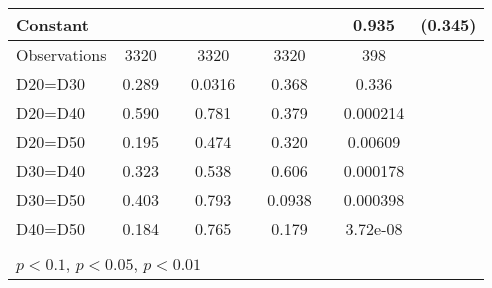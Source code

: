 \begin{tabular}{l|cccccc|cc}
Constant        &                  &         &                  &         &                  &         &    0.935\sym{***}&  (0.345)\\
\hline
Observations    &     3320         &         &     3320         &         &     3320         &         &      398         &         \\
D20=D30         &    0.289         &         &   0.0316         &         &    0.368         &         &    0.336         &         \\
D20=D40         &    0.590         &         &    0.781         &         &    0.379         &         & 0.000214         &         \\
D20=D50         &    0.195         &         &    0.474         &         &    0.320         &         &  0.00609         &         \\
D30=D40         &    0.323         &         &    0.538         &         &    0.606         &         & 0.000178         &         \\
D30=D50         &    0.403         &         &    0.793         &         &   0.0938         &         & 0.000398         &         \\
D40=D50         &    0.184         &         &    0.765         &         &    0.179         &         & 3.72e-08         &         \\
\hline\hline
\multicolumn{9}{p{16cm}}{\tiny }\\
\multicolumn{9}{l}{\tiny \sym{*} \(p<0.1\), \sym{**} \(p<0.05\), \sym{***} \(p<0.01\)}\\
\end{tabular}